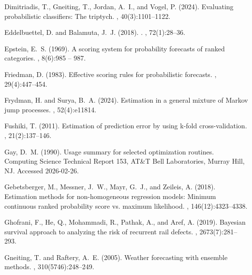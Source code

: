 \documentclass{article}
\begin{document}
\begin{thebibliography}{}
Dimitriadis, T., Gneiting, T., Jordan, A.~I., and Vogel, P. (2024).
\newblock Evaluating probabilistic classifiers: The triptych.
, 40(3):1101--1122.

Eddelbuettel, D. and Balamuta, J.~J. (2018).
.
, 72(1):28--36.

Epstein, E.~S. (1969).
\newblock A scoring system for probability forecasts of ranked categories.
, 8(6):985 --
  987.

Friedman, D. (1983).
\newblock Effective scoring rules for probabilistic forecasts.
, 29(4):447--454.

Frydman, H. and Surya, B.~A. (2024).
\newblock Estimation in a general mixture of {Markov} jump processes.
, 52(4):e11814.

Fushiki, T. (2011).
\newblock Estimation of prediction error by using k-fold cross-validation.
, 21(2):137--146.

Gay, D.~M. (1990).
\newblock Usage summary for selected optimization routines.
\newblock Computing Science Technical Report 153, AT\&T Bell Laboratories,
  Murray Hill, NJ.
\newblock Accessed 2026-02-26.

Gebetsberger, M., Messner, J.~W., Mayr, G.~J., and Zeileis, A. (2018).
\newblock Estimation methods for non-homogeneous regression models: Minimum
  continuous ranked probability score vs. maximum likelihood.
, 146(12):4323--4338.

Ghofrani, F., He, Q., Mohammadi, R., Pathak, A., and Aref, A. (2019).
\newblock Bayesian survival approach to analyzing the risk of recurrent rail
  defects.
, 2673(7):281--293.

Gneiting, T. and Raftery, A.~E. (2005).
\newblock Weather forecasting with ensemble methods.
, 310(5746):248--249.


\end{thebibliography}
\end{document}
